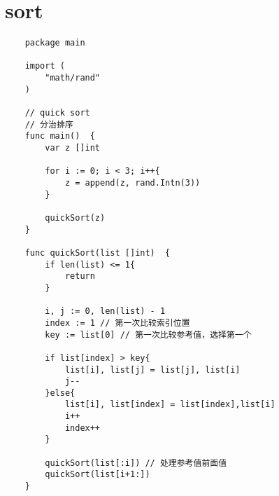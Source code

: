 \documentclass[oneside,12pt,twiside,a4paper]{ctexbook}
\begin{document}
\section{sort}
\begin{lstlisting}
    package main

    import (
        "math/rand"
    )
    
    // quick sort
    // 分治排序
    func main()  {
        var z []int
    
        for i := 0; i < 3; i++{
            z = append(z, rand.Intn(3))
        }
        
        quickSort(z)	
    }
    
    func quickSort(list []int)  {
        if len(list) <= 1{
            return
        }
    
        i, j := 0, len(list) - 1
        index := 1 // 第一次比较索引位置
        key := list[0] // 第一次比较参考值，选择第一个
    
        if list[index] > key{
            list[i], list[j] = list[j], list[i]
            j--
        }else{
            list[i], list[index] = list[index],list[i]
            i++
            index++
        }
    
        quickSort(list[:i]) // 处理参考值前面值
        quickSort(list[i+1:])
    }
\end{lstlisting}
\end{document}
